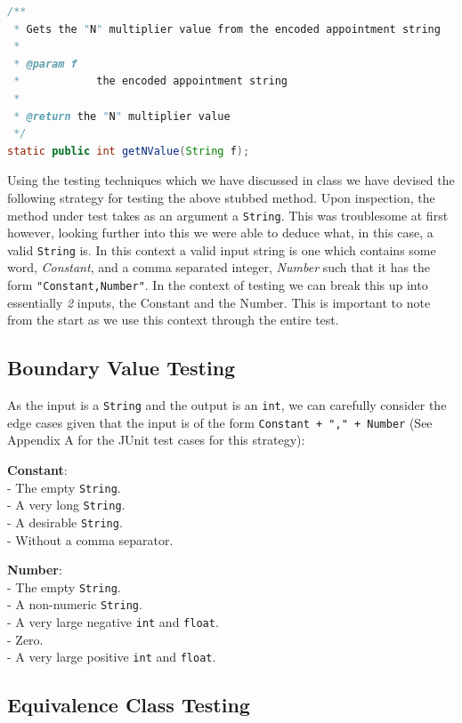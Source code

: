 \begin{lstlisting}[language=Java]
/**
 * Gets the "N" multiplier value from the encoded appointment string
 *
 * @param f
 *            the encoded appointment string
 *
 * @return the "N" multiplier value
 */
static public int getNValue(String f);
\end{lstlisting}

Using the testing techniques which we have discussed in class we have
devised the following strategy for testing the above stubbed method.
Upon inspection, the method under test takes as an argument a
\lstinline!String!. This was troublesome at first however, looking
further into this we were able to deduce what, in this case, a valid
\lstinline!String! is. In this context a valid input string is one which
contains some word, \emph{Constant}, and a comma separated integer,
\emph{Number} such that it has the form \lstinline!"Constant,Number"!.
In the context of testing we can break this up into essentially \emph{2}
inputs, the Constant and the Number. This is important to note from the
start as we use this context through the entire test.

\subsection{Boundary Value Testing}\label{boundary-value-testing-1}

As the input is a \lstinline!String! and the output is an
\lstinline!int!, we can carefully consider the edge cases given that the
input is of the form \lstinline!Constant + "," + Number! (See Appendix A
for the JUnit test cases for this strategy):

\textbf{Constant}:\\
- The empty \lstinline!String!.\\
- A very long \lstinline!String!.\\
- A desirable \lstinline!String!.\\
- Without a comma separator.

\textbf{Number}:\\
- The empty \lstinline!String!.\\
- A non-numeric \lstinline!String!.\\
- A very large negative \lstinline!int! and \lstinline!float!.\\
- Zero.\\
- A very large positive \lstinline!int! and \lstinline!float!.

\subsection{Equivalence Class Testing}\label{equivalence-class-testing}


